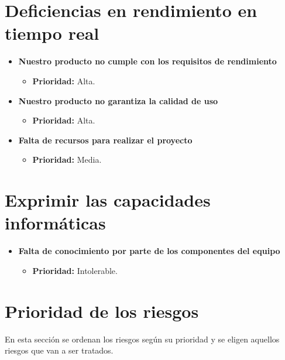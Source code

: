 \documentclass[spanish,a4paper,12pt]{report}	%
\begin{document}
\section{Deficiencias en rendimiento en tiempo real}
	\begin{itemize}
		\item \textbf{Nuestro producto no cumple con los requisitos de rendimiento}	%
			\begin{itemize}
				\item \textbf{Prioridad: }Alta.
			\end{itemize}
		
		\item \textbf{Nuestro producto no garantiza la calidad de uso}%
			\begin{itemize}
				\item \textbf{Prioridad: }Alta.
			\end{itemize}

		\item \textbf{Falta de recursos para realizar el proyecto}	
			\begin{itemize}
				\item \textbf{Prioridad: }Media.
			\end{itemize}
	\end{itemize}
%
\section{Exprimir las capacidades informáticas}
	\begin{itemize}
		\item \textbf{Falta de conocimiento por parte de los componentes del equipo}	
			\begin{itemize}
				\item \textbf{Prioridad: }Intolerable.
			\end{itemize}
	\end{itemize}
	
\section{Prioridad de los riesgos}
		En esta sección se ordenan los riesgos según su prioridad y se eligen aquellos riesgos que van a ser tratados.\\ \ \\ 
\end{document}

